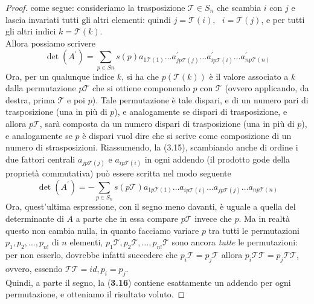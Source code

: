 \documentclass{book}
\begin{document}
\begin{enumerate}
\begin{proof}
			come segue: consideriamo la trasposizione $\mathcal{T}\in S_n$ che
			scambia $i$ con $j$ e lascia invariati tutti gli altri elementi:
			quindi $j=\mathcal{T}(i), \text{ } i=\mathcal{T}(j)$, e per tutti
			gli altri indici $k =\mathcal{T}(k)$.\\
			Allora possiamo scrivere
			\begin{equation}
				\det(A^\prime) = \sum_{p\in Sn} s(p) a_{1\mathcal{T}(1)}\dots
				a^\prime_{jp\mathcal{T}(j)}\dots a^\prime_{ip\mathcal{T}(i)}
				\dots a^\prime_{np\mathcal{T}(n)} 
			\end{equation}
			Ora, per un qualunque indice $k$, si ha che $p(\mathcal{T}(k))$ è
			il valore associato a $k$ dalla permutazione $p \mathcal{T}$ che si
			ottiene componendo $p$ con $\mathcal{T}$ (ovvero applicando, da
			destra, prima $\mathcal{T}$ e poi $p$). Tale permutazione è tale
			dispari, e di un numero pari di trasposizione (una in più di $p$),
			e analogamente se dispari di trasposizione, e allora
			$p\mathcal{T}$, sarà composta da un numero dispari di trasposizione
			(una in più di $p$), e analogamente se $p$ è dispari vuol dire che
			si scrive come composizione di un numero di strasposizioni.
			Riassumendo, la (3.15), scambiando anche di ordine i due fattori
			centrali $a_{j p\mathcal{T}(j)}$ e $a_{ip\mathcal{T}(i)}$ in ogni
			addendo (il prodotto gode della proprietà commutativa) può essere
			scritta nel modo seguente
			\begin{equation}
				\det(A^\prime) = -\sum_{p\in S_n} s(p\mathcal{T})
				a_{1p\mathcal{T}(1)} \dots a_{i p\mathcal{T}(i)} \dots a_{j
				p\mathcal{T}(j)} \dots a_{n p\mathcal{T}(n)}
			\end{equation}
			Ora, quest'ultima espressione, con il segno meno davanti, è uguale
			a quella del determinante di $A$ a parte che in essa compare
			$p\mathcal{T}$ invece che $p$. Ma in realtà questo non cambia
			nulla, in quanto facciamo variare $p$ tra tutti le permutazioni
			$p_1,p_2,\dots,p_{n!}$ di $n$ elementi, $p_1\mathcal{T},
			p_2\mathcal{T},\dots,p_{n!}\mathcal{T}$ sono ancora {\em tutte} le
			permutazioni: per non esserlo, dovrebbe infatti succedere che
                        $p_i\mathcal{T}=p_j\mathcal{T}$ allora
                        $p_i\mathcal{T}\mathcal{T}=p_j\mathcal{T}\mathcal{T}$, ovvero, essendo
                        $\mathcal{T}\mathcal{T}=id,p_i=p_j$.\\
                        Quindi, a parte il segno, la ({\bf 3.16}) contiene esattamente un
                        addendo per ogni permutazione, e otteniamo il risultato voluto.
		\end{proof}
\end{enumerate}
\end{document}
